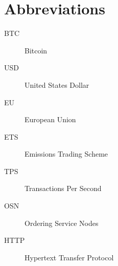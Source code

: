 \chapter*{Abbreviations}\label{abbr}
\begin{description}
    \item[BTC] Bitcoin
    \item[USD] United States Dollar
    \item[EU] European Union
    \item[ETS] Emissions Trading Scheme
    \item[TPS] Transactions Per Second
    \item[OSN] Ordering Service Nodes
    \item[HTTP] Hypertext Transfer Protocol
\end{description}
